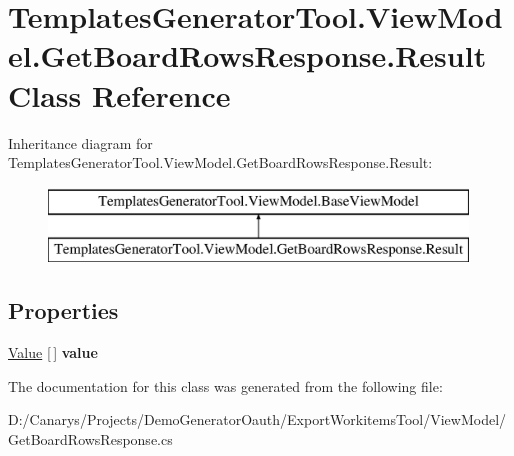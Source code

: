 \hypertarget{class_templates_generator_tool_1_1_view_model_1_1_get_board_rows_response_1_1_result}{}\section{Templates\+Generator\+Tool.\+View\+Model.\+Get\+Board\+Rows\+Response.\+Result Class Reference}
\label{class_templates_generator_tool_1_1_view_model_1_1_get_board_rows_response_1_1_result}
Inheritance diagram for Templates\+Generator\+Tool.\+View\+Model.\+Get\+Board\+Rows\+Response.\+Result\+:\begin{figure}[H]
\begin{center}
\leavevmode
\includegraphics[height=2.000000cm]{class_templates_generator_tool_1_1_view_model_1_1_get_board_rows_response_1_1_result}
\end{center}
\end{figure}
\subsection*{Properties}
\begin{DoxyCompactItemize}
\item 
\mbox{\label{class_templates_generator_tool_1_1_view_model_1_1_get_board_rows_response_1_1_result_aa01446d926e9cb012931db546650257d}} 
\mbox{\hyperlink{class_templates_generator_tool_1_1_view_model_1_1_get_board_rows_response_1_1_value}{Value}} \mbox{[}$\,$\mbox{]} {\bfseries value}
\end{DoxyCompactItemize}


The documentation for this class was generated from the following file\+:\begin{DoxyCompactItemize}
\item 
D\+:/\+Canarys/\+Projects/\+Demo\+Generator\+Oauth/\+Export\+Workitems\+Tool/\+View\+Model/Get\+Board\+Rows\+Response.\+cs\end{DoxyCompactItemize}
